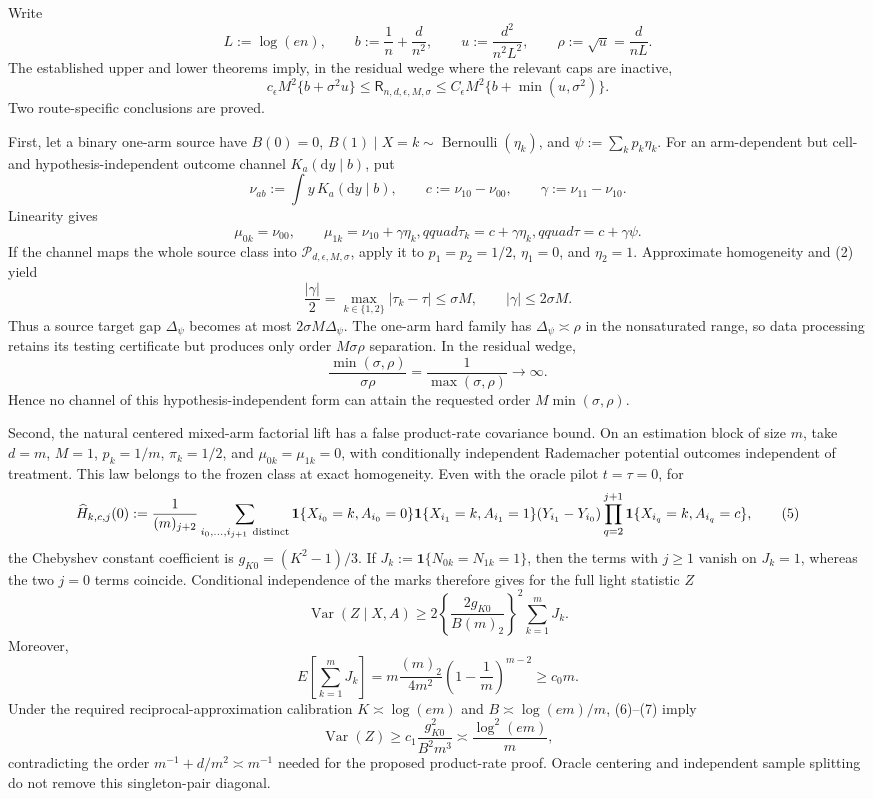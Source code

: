 Write
\[
 L:=\log(en),\qquad b:=\frac1n+\frac d{n^2},\qquad
 u:=\frac{d^2}{n^2L^2},\qquad \rho:=\sqrt u=\frac d{nL}.
\]
The established upper and lower theorems imply, in the residual wedge where the relevant caps are inactive,
\[
 c_{\epsilon}M^2\{b+\sigma^2u\}
 \le \mathsf R_{n,d,\epsilon,M,\sigma}
 \le C_{\epsilon}M^2\{b+\min(u,\sigma^2)\}.
\tag{1}
\]
Two route-specific conclusions are proved.

First, let a binary one-arm source have \(B(0)=0\), \(B(1)\mid X=k\sim\operatorname{Bernoulli}(\eta_k)\), and \(\psi:=\sum_kp_k\eta_k\).  For an arm-dependent but cell- and hypothesis-independent outcome channel \(K_a(\mathrm dy\mid b)\), put
\[
 \nu_{ab}:=\int y\,K_a(\mathrm dy\mid b),\qquad
 c:=\nu_{10}-\nu_{00},\qquad \gamma:=\nu_{11}-\nu_{10}.
\]
Linearity gives
\[
 \mu_{0k}=\nu_{00},\qquad
 \mu_{1k}=\nu_{10}+\gamma\eta_k,qquad
 \tau_k=c+\gamma\eta_k,qquad
 \tau=c+\gamma\psi.
\tag{2}
\]
If the channel maps the whole source class into \(\mathcal P_{d,\epsilon,M,\sigma}\), apply it to \(p_1=p_2=1/2\), \(\eta_1=0\), and \(\eta_2=1\).  Approximate homogeneity and (2) yield
\[
 \frac{|\gamma|}{2}
 =\max_{k\in\{1,2\}}|\tau_k-\tau|
 \le \sigma M,
 \qquad |\gamma|\le2\sigma M.
\tag{3}
\]
Thus a source target gap \(\Delta_{\psi}\) becomes at most \(2\sigma M\Delta_{\psi}\).  The one-arm hard family has \(\Delta_{\psi}\asymp\rho\) in the nonsaturated range, so data processing retains its testing certificate but produces only order \(M\sigma\rho\) separation.  In the residual wedge,
\[
 \frac{\min(\sigma,\rho)}{\sigma\rho}
 =\frac1{\max(\sigma,\rho)}\longrightarrow\infty.
\tag{4}
\]
Hence no channel of this hypothesis-independent form can attain the requested order \(M\min(\sigma,\rho)\).

Second, the natural centered mixed-arm factorial lift has a false product-rate covariance bound.  On an estimation block of size \(m\), take \(d=m\), \(M=1\), \(p_k=1/m\), \(\pi_k=1/2\), and \(\mu_{0k}=\mu_{1k}=0\), with conditionally independent Rademacher potential outcomes independent of treatment.  This law belongs to the frozen class at exact homogeneity.  Even with the oracle pilot \(t=\tau=0\), for
\[
 \widehat H_{k,c,j}(0)
 :=\frac1{(m)_{j+2}}
 \sum_{i_0,\ldots,i_{j+1}\ {\rm distinct}}
 \mathbf1\{X_{i_0}=k,A_{i_0}=0\}
 \mathbf1\{X_{i_1}=k,A_{i_1}=1\}
 (Y_{i_1}-Y_{i_0})
 \prod_{q=2}^{j+1}\mathbf1\{X_{i_q}=k,A_{i_q}=c\},
\tag{5}
\]
the Chebyshev constant coefficient is \(g_{K0}=(K^2-1)/3\).  If \(J_k:=\mathbf1\{N_{0k}=N_{1k}=1\}\), then the terms with \(j\ge1\) vanish on \(J_k=1\), whereas the two \(j=0\) terms coincide.  Conditional independence of the marks therefore gives for the full light statistic \(Z\)
\[
 \operatorname{Var}(Z\mid X,A)
 \ge 2\left\{\frac{2g_{K0}}{B(m)_2}\right\}^{\!2}
 \sum_{k=1}^mJ_k.
\tag{6}
\]
Moreover,
\[
 E\!\left[\sum_{k=1}^mJ_k\right]
 =m\frac{(m)_2}{4m^2}
 \left(1-\frac1m\right)^{m-2}
 \ge c_0m.
\tag{7}
\]
Under the required reciprocal-approximation calibration \(K\asymp\log(em)\) and \(B\asymp\log(em)/m\), (6)--(7) imply
\[
 \operatorname{Var}(Z)
 \ge c_1\frac{g_{K0}^2}{B^2m^3}
 \asymp\frac{\log^2(em)}m,
\tag{8}
\]
contradicting the order \(m^{-1}+d/m^2\asymp m^{-1}\) needed for the proposed product-rate proof.  Oracle centering and independent sample splitting do not remove this singleton-pair diagonal.

